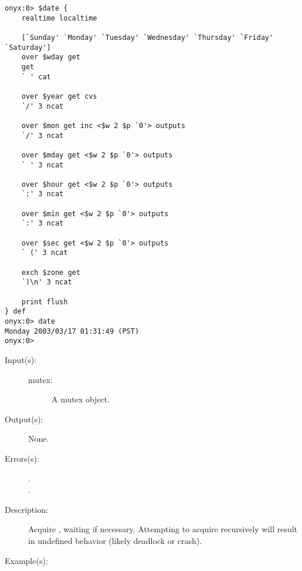 \begin{description}
\begin{description}
\begin{verbatim}
onyx:0> $date {
    realtime localtime

    [`Sunday' `Monday' `Tuesday' `Wednesday' `Thursday' `Friday' `Saturday']
    over $wday get
    get
    ` ' cat

    over $year get cvs
    `/' 3 ncat

    over $mon get inc <$w 2 $p `0'> outputs
    `/' 3 ncat

    over $mday get <$w 2 $p `0'> outputs
    ` ' 3 ncat

    over $hour get <$w 2 $p `0'> outputs
    `:' 3 ncat

    over $min get <$w 2 $p `0'> outputs
    `:' 3 ncat

    over $sec get <$w 2 $p `0'> outputs
    ` (' 3 ncat

    exch $zone get
    `)\n' 3 ncat

    print flush
} def
onyx:0> date
Monday 2003/03/17 01:31:49 (PST)
onyx:0>
		\end{verbatim}
	\end{description}
\label{systemdict:lock}
\item[{\onyxop{mutex}{lock}{--}}: ]
	\begin{description}\item[]
	\item[Input(s): ]
		\begin{description}\item[]
		\item[mutex: ]
			A mutex object.
		\end{description}
	\item[Output(s): ] None.
	\item[Errors(s): ]
		\begin{description}\item[]
		\item[.]
		\item[.]
		\end{description}
	\item[Description: ]
		Acquire , waiting if necessary.  Attempting to
		acquire  recursively will result in undefined
		behavior (likely deadlock or crash).
	\item[Example(s): ]\begin{verbatim}


\end{verbatim}
\end{description}
\end{description}
